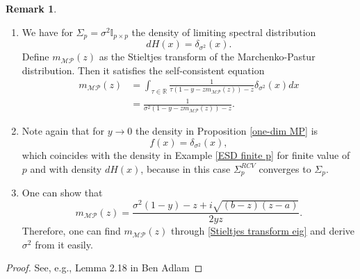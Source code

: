 \documentclass[a4paper,11pt]{article}
\theoremstyle{plain}
\theoremstyle{definition}
\newtheorem{rmrk}[thm]{Remark}
\newcommand{\MR}{\mathbb{R}}
\begin{document}
	\begin{rmrk} \
		\begin{enumerate}
			\item We have for $\Sigma_p = \sigma^2 \mathbb{I}_{p \times p}$ the density of limiting spectral distribution
			\[ dH(x) = \delta_{\sigma^2}(x). \]
			Define $m_{\mathcal{MP}}(z)$ as the Stieltjes transform of the Marchenko-Pastur distribution. Then it satisfies the self-consistent equation
			\[
			\begin{aligned}
			m_{\mathcal{MP}}(z) & = \int_{\tau \in \MR} \frac{1}{ \tau( 1-y-zm_{\mathcal{MP}}(z))-z} \delta_{\sigma^2}(x) dx \\
			& =  \frac{1}{ \sigma^2( 1-y-zm_{\mathcal{MP}}(z))-z}.
			\end{aligned}
			\]
			\item Note again that for $y \rightarrow 0$ the density in Proposition \ref{one-dim MP} is
			\[f(x) = \delta_{\sigma^2}(x), \]
			which coincides with the density in Example \ref{ESD finite p} for finite value of $p$ and with density $dH(x)$, because in this case $\Sigma_p^{RCV}$ converges to $\Sigma_p$.
			\item One can show that
			\[ m_{\mathcal{MP}}(z) = \frac{\sigma^2(1-y)-z+ i \sqrt{(b-z)(z-a)}}{2yz}. \]
			Therefore, one can find $m_{\mathcal{MP}}(z)$ through \eqref{Stieltjes transform eig} and derive $\sigma^2$ from it easily.
		\end{enumerate}
		\begin{proof}
			See, e.g., Lemma 2.18 in Ben Adlam
		\end{proof}
	\end{rmrk}
	
\end{document}

